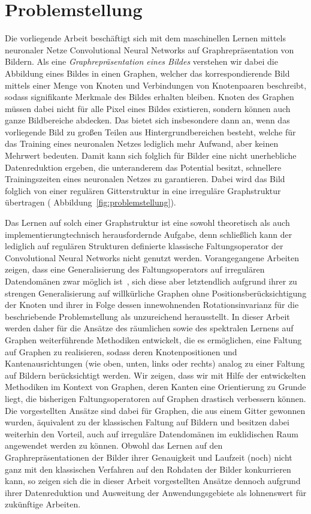 \section{Problemstellung}
\label{problemstellung}

Die vorliegende Arbeit beschäftigt sich mit dem maschinellen Lernen mittels neuronaler Netze \bzw{} Convolutional Neural Networks auf Graphrepräsentation von Bildern.
Als eine \emph{Graphrepräsentation eines Bildes} verstehen wir dabei die Abbildung eines Bildes in einen Graphen, welcher das korrespondierende Bild mittels einer Menge von Knoten und Verbindungen von Knotenpaaren beschreibt, sodass signifikante Merkmale des Bildes erhalten bleiben.
Knoten des Graphen müssen dabei nicht für alle Pixel eines Bildes existieren, sondern können auch ganze Bildbereiche abdecken.
Das bietet sich insbesondere dann an, wenn das vorliegende Bild zu großen Teilen aus Hintergrundbereichen besteht, welche für das Training eines neuronalen Netzes lediglich mehr Aufwand, aber keinen Mehrwert bedeuten.
Damit kann sich folglich für Bilder eine nicht unerhebliche Datenreduktion ergeben, die unteranderem das Potential besitzt, schnellere Trainingszeiten eines neuronalen Netzes zu garantieren.
Dabei wird das Bild folglich von einer regulären Gitterstruktur in eine irreguläre Graphstruktur übertragen (\vgl{} Abbildung~\ref{fig:problemstellung}).

Das Lernen auf solch einer Graphstruktur ist eine sowohl theoretisch als auch implementierungtechnisch herausfordernde Aufgabe, denn schließlich kann der lediglich auf regulären Strukturen definierte klassische Faltungsoperator der Convolutional Neural Networks nicht genutzt werden.
Vorangegangene Arbeiten zeigen, dass eine Generalisierung des Faltungsoperators auf irregulären Datendomänen zwar möglich ist~\cite{patchy, Defferrard, gcn}, sich diese aber letztendlich aufgrund ihrer zu strengen Generalisierung auf willkürliche Graphen ohne Positionsberücksichtigung der Knoten und ihrer in Folge dessen innewohnenden Rotationsinvarianz für die beschriebende Problemstellung als unzureichend herausstellt.
In dieser Arbeit werden daher für die Ansätze des räumlichen sowie des spektralen Lernens auf Graphen weiterführende Methodiken entwickelt, die es ermöglichen, eine Faltung auf Graphen zu realisieren, sodass deren Knotenpositionen und Kantenausrichtungen (wie oben, unten, links oder rechts) analog zu einer Faltung auf Bildern berücksichtigt werden.
Wir zeigen, dass wir mit Hilfe der entwickelten Methodiken im Kontext von Graphen, deren Kanten eine Orientierung zu Grunde liegt, die bisherigen Faltungsoperatoren auf Graphen drastisch verbessern können.
Die vorgestellten Ansätze sind dabei für Graphen, die aus einem Gitter gewonnen wurden, äquivalent zu der klassischen Faltung auf Bildern und besitzen dabei weiterhin den Vorteil, auch auf irreguläre Datendomänen im euklidischen Raum angewendet werden zu können.
Obwohl das Lernen auf den Graphrepräsentationen der Bilder \bzgl{} ihrer Genauigkeit und Laufzeit (noch) nicht ganz mit den klassischen Verfahren auf den Rohdaten der Bilder konkurrieren kann, so zeigen sich die in dieser Arbeit vorgestellten Ansätze dennoch aufgrund ihrer Datenreduktion und Ausweitung der Anwendungsgebiete als lohnenswert für zukünftige Arbeiten.
